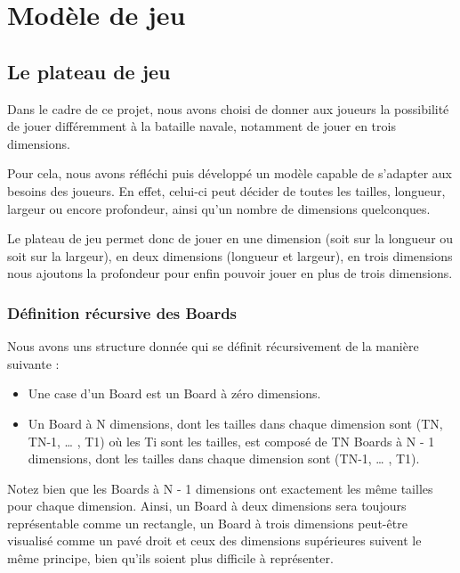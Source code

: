 \section{Modèle de jeu}

\subsection{Le plateau de jeu}

	Dans le cadre de ce projet, nous avons choisi de donner aux joueurs la possibilité de jouer différemment à la bataille navale, notamment de jouer en trois dimensions.\newline
	
	Pour cela, nous avons réfléchi puis développé un modèle capable de s'adapter aux besoins des joueurs. En effet, celui-ci peut décider de toutes les tailles, longueur, largeur ou encore profondeur, ainsi qu'un nombre de dimensions quelconques. \newline
	
	Le plateau de jeu permet donc de jouer en une dimension (soit sur la longueur ou soit sur la largeur), en deux dimensions (longueur et largeur), en trois dimensions nous ajoutons la profondeur pour enfin pouvoir jouer en plus de trois dimensions.\newline
	
	\subsubsection{Définition récursive des Boards}
		Nous avons uns structure donnée qui se définit récursivement de la manière suivante : \newline
		\begin{itemize}
		\item Une case d'un Board est un Board à zéro dimensions.\newline
		\item Un Board à N dimensions, dont les tailles dans chaque dimension sont (TN, TN-1, … , T1) où les Ti sont les tailles, est composé de TN Boards à N - 1 dimensions, dont les tailles dans chaque dimension sont (TN-1, … , T1). 
		\end{itemize}
			
	Notez bien que les Boards à N - 1 dimensions ont exactement les même tailles pour chaque dimension. Ainsi, un Board à deux dimensions sera toujours représentable comme un rectangle, un Board à trois dimensions peut-être visualisé comme un pavé droit et ceux des dimensions supérieures suivent le même principe, bien qu'ils soient plus difficile à représenter.
\newline


